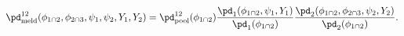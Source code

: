 \begin{equation}
  \pd_{\text{meld}}^{12}(\phi_{1 \cap 2}, \phi_{2 \cap 3}, \psi_{1}, \psi_{2}, Y_{1}, Y_{2}) = 
    \pd_{\text{pool}}^{12}(\phi_{1 \cap 2})
    \frac{
      \pd_{1}(\phi_{1 \cap 2}, \psi_{1}, Y_{1})
    } {
      \pd_{1}(\phi_{1 \cap 2})
    }
    \frac{
      \pd_{2}(\phi_{1 \cap 2}, \phi_{2 \cap 3}, \psi_{2}, Y_{2})
    } {
      \pd_{2}(\phi_{1 \cap 2})
    }.
  \label{eqn:usual-melded-model}
\end{equation}